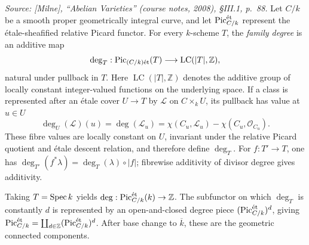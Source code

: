 \begin{definition}\notready
  \label{def:divisor_degree_pic}

  \textit{Source: [Milne], ``Abelian Varieties'' (course notes, 2008),
  \S III.1, p.~88.}
  Let \(C/k\) be a smooth proper geometrically integral curve, and let
  \(\operatorname{Pic}^{\mathrm{\acute{e}t}}_{C/k}\) represent the \'etale-sheafified relative Picard
  functor. For every \(k\)-scheme \(T\), the \emph{family degree} is an
  additive map
  \[
    \deg_T:\operatorname{Pic}_{(C/k)\mathrm{\acute{e}t}}(T)
      \longrightarrow \operatorname{LC}(|T|,\mathbb Z),
  \]
  natural under pullback in \(T\). Here
  \(\operatorname{LC}(|T|,\mathbb Z)\) denotes the additive group of locally
  constant integer-valued functions on the underlying space. If a class is
  represented after an \'etale cover \(U\to T\) by \(\mathcal L\) on
  \(C\times_kU\), its pullback has value at \(u\in U\)
  \[
    \deg_U(\mathcal L)(u)=\deg(\mathcal L_u)
    =\chi(C_u,\mathcal L_u)-\chi(C_u,\mathcal O_{C_u}).
  \]
  These fibre values are locally constant on \(U\), invariant under the
  relative Picard quotient and \'etale descent relation, and therefore define
  \(\deg_T\). For \(f:T'\to T\), one has
  \(\deg_{T'}(f^*\lambda)=\deg_T(\lambda)\circ|f|\); fibrewise additivity of
  divisor degree gives additivity.

  Taking \(T=\operatorname{Spec} k\) yields
  \(\deg:\operatorname{Pic}^{\mathrm{\acute{e}t}}_{C/k}(k)\to\mathbb Z\). The subfunctor on which
  \(\deg_T\) is constantly \(d\) is represented by an open-and-closed degree
  piece \((\operatorname{Pic}^{\mathrm{\acute{e}t}}_{C/k})^d\), giving
  \(\operatorname{Pic}^{\mathrm{\acute{e}t}}_{C/k}=\coprod_{d\in\mathbb Z}(\operatorname{Pic}^{\mathrm{\acute{e}t}}_{C/k})^d\). After
  base change to \(\overline k\), these are the geometric connected components.
\end{definition}

